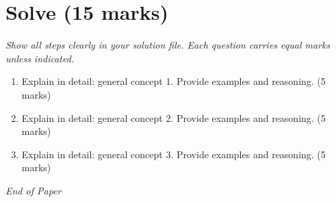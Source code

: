 \documentclass[12pt]{article}
\begin{document}
\section*{Solve (15 marks)}
\textit{Show all steps clearly in your solution file. Each question carries equal marks unless indicated.}

\begin{enumerate}[label=\arabic*.]

\item Explain in detail: general concept 1. Provide examples and reasoning.  \hfill (5 marks)

\item Explain in detail: general concept 2. Provide examples and reasoning.  \hfill (5 marks)

\item Explain in detail: general concept 3. Provide examples and reasoning.  \hfill (5 marks)

\end{enumerate}


\vfill
\noindent\textit{End of Paper}
\end{document}
